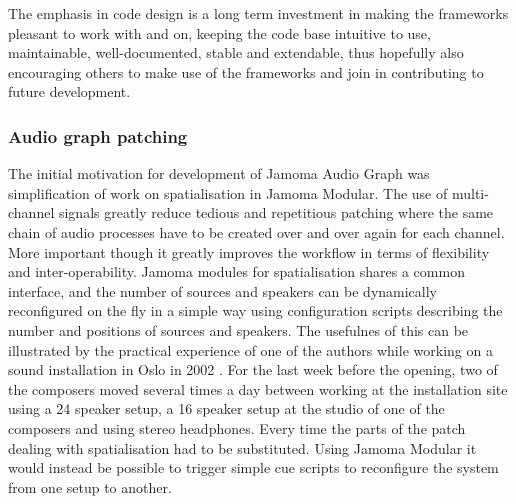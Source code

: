 \documentclass[twoside,a4paper]{article}
\begin{document}
The emphasis in code design is a long term investment in making the frameworks pleasant to work with and on, keeping the code base intuitive to use, maintainable, well-documented, stable and extendable, thus hopefully also encouraging others to make use of the frameworks and join in contributing to future development.



%
%
%


\subsubsection{Audio graph patching} %


The initial motivation for development of Jamoma Audio Graph was simplification of work on spatialisation in Jamoma Modular. 
The use of multi-channel signals greatly reduce tedious and repetitious patching where the same chain of audio processes have to be created over and over again for each channel. 
More important though it greatly improves the workflow in terms of flexibility and inter-operability.
Jamoma modules for spatialisation shares a common interface, and the number of sources and speakers can be dynamically reconfigured on the fly in a simple way using configuration scripts describing the number and positions of sources and speakers. 
The usefulnes of this can be illustrated by the practical experience of one of the authors while working on a sound installation in Oslo in 2002 \cite{Rudi:2003}.
For the last week before the opening, two of the composers moved several times a day between working at the installation site using a 24 speaker setup, a 16 speaker setup at the studio of one of the composers and using stereo headphones.
Every time the parts of the patch dealing with spatialisation had to be substituted.
Using Jamoma Modular it would instead be possible to trigger simple cue scripts to reconfigure the system from one setup to another.
\end{document}

